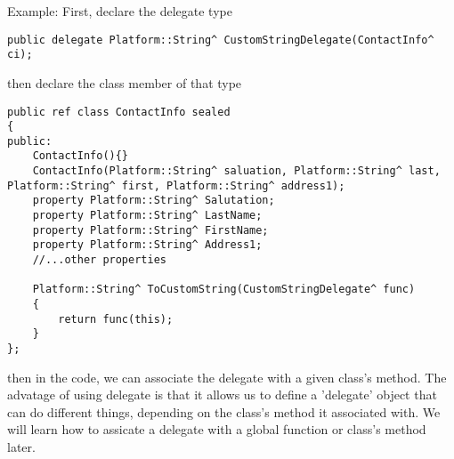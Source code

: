 Example: First, declare the delegate type
\begin{verbatim}
public delegate Platform::String^ CustomStringDelegate(ContactInfo^ ci);
\end{verbatim}
then declare the class member of that type
\begin{verbatim}
public ref class ContactInfo sealed
{        
public:
    ContactInfo(){}
    ContactInfo(Platform::String^ saluation, Platform::String^ last, Platform::String^ first, Platform::String^ address1);
    property Platform::String^ Salutation;
    property Platform::String^ LastName;
    property Platform::String^ FirstName;
    property Platform::String^ Address1;
    //...other properties

    Platform::String^ ToCustomString(CustomStringDelegate^ func)
    {
        return func(this);
    }       
};
\end{verbatim}
then in the code, we can associate the delegate with a given class's method. The
advatage of using delegate is that it allows us to define a 'delegate' object
that can do different things, depending on the class's method it associated
with. We will learn how to assicate a delegate with a global function or class's
method later.

